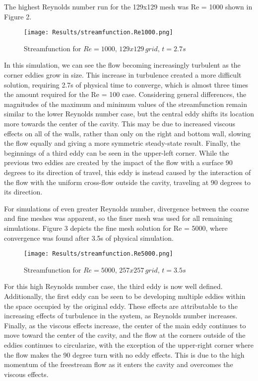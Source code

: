 \documentclass[twocolumn,10pt]{asme2ej}
\begin{document}
The highest Reynolds number run for the 129x129 mesh was Re = 1000 shown in Figure 2.

\vspace{-2em}
\begin{figure}[htb]
\begin{center}
\texttt{[image: Results/streamfunction.Re1000.png]}
\caption{Streamfunction for $Re = 1000,\, 129x129\, grid ,\, t = 2.7s$}
\end{center}
\end{figure}
\vspace{-2em}

In this simulation, we can see the flow becoming increasingly turbulent as the corner eddies grow in size.  This increase in turbulence created a more difficult solution, requiring 2.7s of physical time to converge, which is almost three times the amount required for the Re = 100 case.  Considering general differences, the magnitudes of the maximum and minimum values of the streamfunction remain similar to the lower Reynolds number case, but the central eddy shifts its location more towards the center of the cavity.  This may be due to increased viscous effects on all of the walls, rather than only on the right and bottom wall, slowing the flow equally and giving a more symmetric steady-state result.  Finally, the beginnings of a third eddy can be seen in the upper-left corner.  While the previous two eddies are created by the impact of the flow with a surface 90 degrees to its direction of travel, this eddy is instead caused by the interaction of the flow with the uniform cross-flow outside the cavity, traveling at 90 degrees to its direction.

For simulations of even greater Reynolds number, divergence between the coarse and fine meshes was apparent, so the finer mesh was used for all remaining simulations.  Figure 3 depicts the fine mesh solution for Re = 5000, where convergence was found after 3.5s of physical simulation.

\vspace{-2em}
\begin{figure}[htb]
\begin{center}
\texttt{[image: Results/streamfunction.Re5000.png]}
\caption{Streamfunction for $Re = 5000,\, 257x257\, grid ,\, t = 3.5s$}
\end{center}
\end{figure}
\vspace{-2em}

For this high Reynolds number case, the third eddy is now well defined.  Additionally, the first eddy can be seen to be developing multiple eddies within the space occupied by the original eddy.  These effects are attributable to the increasing effects of turbulence in the system, as Reynolds number increases.  Finally, as the viscous effects increase, the center of the main eddy continues to move toward the center of the cavity, and the flow at the corners outside of the eddies continues to circularize, with the exception of the upper-right corner where the flow makes the 90 degree turn with no eddy effects.  This is due to the high momentum of the freestream flow as it enters the cavity and overcomes the viscous effects.
\end{document}
